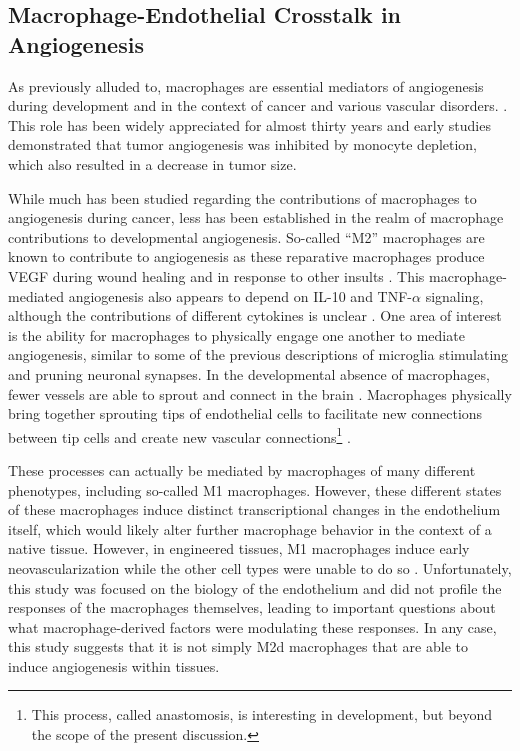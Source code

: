 \subsection{Macrophage\hyp{}Endothelial Crosstalk in Angiogenesis}\label{macang}

As previously alluded to, macrophages are essential mediators of angiogenesis during development and in the context of cancer and various vascular disorders. \citep{Sunderkotter1994, Ribatti2007, Chung2011, Weis2011}. This role has been widely appreciated for almost thirty years and early studies demonstrated that tumor angiogenesis was inhibited by monocyte depletion, which also resulted in a decrease in tumor size. 

While much has been studied regarding the contributions of macrophages to angiogenesis during cancer, less has been established in the realm of macrophage contributions to developmental angiogenesis. So\hyp{}called ``M2'' macrophages are known to contribute to angiogenesis as these reparative macrophages produce VEGF during wound healing and in response to other insults \citep{Jetten2014}. This macrophage\hyp{}mediated angiogenesis also appears to depend on IL\hyp{}10 and TNF\hyp{}$\alpha$ signaling, although the contributions of different cytokines is unclear \citep{Nakamura2015, Leibovich1987}. One area of interest is the ability for macrophages to physically engage one another to mediate angiogenesis, similar to some of the previous descriptions of microglia stimulating and pruning neuronal synapses. In the developmental absence of macrophages, fewer vessels are able to sprout and connect in the brain \citep{Fantin2010}. Macrophages physically bring together sprouting tips of endothelial cells to facilitate new connections between tip cells and create new vascular connections\footnote{This process, called anastomosis, is interesting in development, but beyond the scope of the present discussion.} \citep{Liu2016}. 

These processes can actually be mediated by macrophages of many different phenotypes, including so\hyp{}called M1 macrophages. However, these different states of these macrophages induce distinct transcriptional changes in the endothelium itself, which would likely alter further macrophage behavior in the context of a native tissue. However, in engineered tissues, M1 macrophages induce early neovascularization while the other cell types were unable to do so \citep{Graney2020}. Unfortunately, this study was focused on the biology of the endothelium and did not profile the responses of the macrophages themselves, leading to important questions about what macrophage\hyp{}derived factors were modulating these responses. In any case, this study suggests that it is not simply M2d macrophages that are able to induce angiogenesis within tissues.

